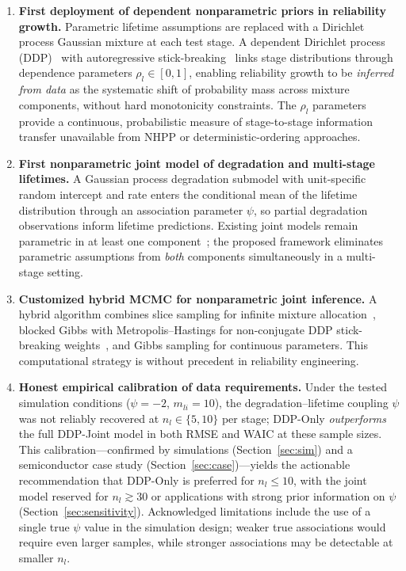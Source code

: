 \documentclass[a4paper,fleqn,longmktitle]{cas-sc}
\begin{document}
\begin{enumerate}
    \item \textbf{First deployment of dependent nonparametric priors in reliability growth.} Parametric lifetime assumptions are replaced with a Dirichlet process Gaussian mixture at each test stage. A dependent Dirichlet process (DDP)~\cite{MacEachern1999,MacEachern2000} with autoregressive stick-breaking~\cite{Griffin2011} links stage distributions through dependence parameters $\rho_l \in [0,1]$, enabling reliability growth to be \emph{inferred from data} as the systematic shift of probability mass across mixture components, without hard monotonicity constraints. The $\rho_l$ parameters provide a continuous, probabilistic measure of stage-to-stage information transfer unavailable from NHPP or deterministic-ordering approaches.

    \item \textbf{First nonparametric joint model of degradation and multi-stage lifetimes.} A Gaussian process degradation submodel with unit-specific random intercept and rate enters the conditional mean of the lifetime distribution through an association parameter $\psi$, so partial degradation observations inform lifetime predictions. Existing joint models remain parametric in at least one component~\cite{Fu2024,Fard2025,Nguyen2023}; the proposed framework eliminates parametric assumptions from \emph{both} components simultaneously in a multi-stage setting.

    \item \textbf{Customized hybrid MCMC for nonparametric joint inference.} A hybrid algorithm combines slice sampling for infinite mixture allocation~\cite{Neal2003,Walker2007,Kalli2011}, blocked Gibbs with Metropolis--Hastings for non-conjugate DDP stick-breaking weights~\cite{Ishwaran2001,Griffin2011}, and Gibbs sampling for continuous parameters. This computational strategy is without precedent in reliability engineering.

    \item \textbf{Honest empirical calibration of data requirements.} Under the tested simulation conditions ($\psi=-2$, $m_{li}=10$), the degradation--lifetime coupling $\psi$ was not reliably recovered at $n_l \in \{5, 10\}$ per stage; DDP-Only \emph{outperforms} the full DDP-Joint model in both RMSE and WAIC at these sample sizes. This calibration---confirmed by simulations (Section~\ref{sec:sim}) and a semiconductor case study (Section~\ref{sec:case})---yields the actionable recommendation that DDP-Only is preferred for $n_l \leq 10$, with the joint model reserved for $n_l \gtrsim 30$ or applications with strong prior information on $\psi$ (Section~\ref{sec:sensitivity}). Acknowledged limitations include the use of a single true $\psi$ value in the simulation design; weaker true associations would require even larger samples, while stronger associations may be detectable at smaller $n_l$.
\end{enumerate}
\end{document}
